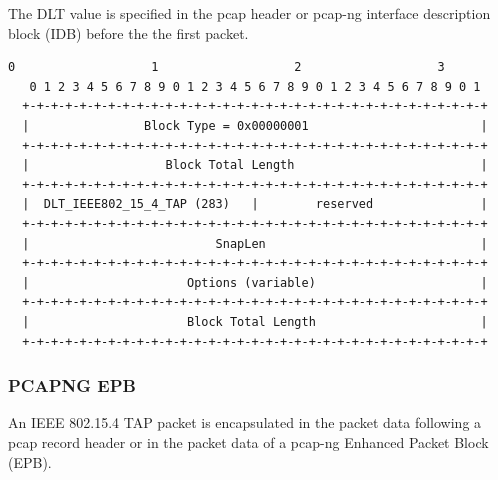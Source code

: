 \documentclass[12pt]{article}
\renewcommand\_{\textunderscore\allowbreak}
\begin{document}
The DLT value is specified in the pcap header or pcap-ng interface description
block (IDB) before the the first packet.

\begin{Verbatim}[samepage=true]
   0                   1                   2                   3
   0 1 2 3 4 5 6 7 8 9 0 1 2 3 4 5 6 7 8 9 0 1 2 3 4 5 6 7 8 9 0 1
  +-+-+-+-+-+-+-+-+-+-+-+-+-+-+-+-+-+-+-+-+-+-+-+-+-+-+-+-+-+-+-+-+
  |                Block Type = 0x00000001                        |
  +-+-+-+-+-+-+-+-+-+-+-+-+-+-+-+-+-+-+-+-+-+-+-+-+-+-+-+-+-+-+-+-+
  |                   Block Total Length                          |
  +-+-+-+-+-+-+-+-+-+-+-+-+-+-+-+-+-+-+-+-+-+-+-+-+-+-+-+-+-+-+-+-+
  |  DLT_IEEE802_15_4_TAP (283)   |        reserved               |
  +-+-+-+-+-+-+-+-+-+-+-+-+-+-+-+-+-+-+-+-+-+-+-+-+-+-+-+-+-+-+-+-+
  |                          SnapLen                              |
  +-+-+-+-+-+-+-+-+-+-+-+-+-+-+-+-+-+-+-+-+-+-+-+-+-+-+-+-+-+-+-+-+
  |                      Options (variable)                       |
  +-+-+-+-+-+-+-+-+-+-+-+-+-+-+-+-+-+-+-+-+-+-+-+-+-+-+-+-+-+-+-+-+
  |                      Block Total Length                       |
  +-+-+-+-+-+-+-+-+-+-+-+-+-+-+-+-+-+-+-+-+-+-+-+-+-+-+-+-+-+-+-+-+
\end{Verbatim}

\newpage
\subsubsection{PCAPNG EPB}

An IEEE 802.15.4 TAP packet is encapsulated in the packet data following a
pcap record header or in the packet data of a pcap-ng Enhanced Packet Block
(EPB).
\end{document}
